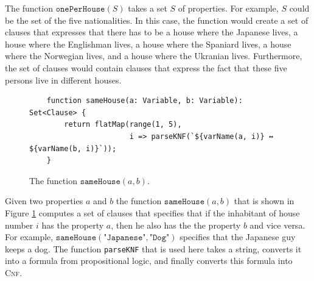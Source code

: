 The function $\texttt{onePerHouse}(S)$ takes a set $S$ of properties.  For
example, $S$ could be the set of the five nationalities.
In this case, the function would create a set of clauses that expresses that
there has to be a house where the Japanese lives, a house where the Englishman
lives, a house where the Spaniard lives, a house where the Norwegian lives, and
a house where the Ukranian lives.  Furthermore, the set of clauses would contain
clauses that express the fact that these five persons live in different houses.


\begin{figure}[!ht]
\centering
\begin{verbatim}
    function sameHouse(a: Variable, b: Variable): Set<Clause> {
        return flatMap(range(1, 5),
                       i => parseKNF(`${varName(a, i)} ↔ ${varName(b, i)}`));
    }
\end{verbatim}
\vspace*{-0.3cm}
\caption{The function $\texttt{sameHouse}(a, b)$.}
\label{fig:sameHouse}
\end{figure}

Given two properties $a$ and $b$ the function $\texttt{sameHouse}(a, b)$ that is
shown in Figure \ref{fig:sameHouse} computes
a set of clauses that specifies that if the inhabitant of house number $i$ has
the property $a$, then he also has the the property $b$ and vice versa.  For
example, $\texttt{sameHouse}(\texttt{"Japanese"}, \texttt{"Dog"})$ specifies
that the Japanese guy keeps a dog.  The function \texttt{parseKNF} that is used here takes a string, converts
it into a formula from propositional logic, and finally converts this formula into \textsc{Cnf}.

